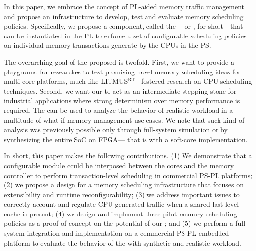 In this paper, we embrace the concept of PL-aided memory traffic
management and propose an infrastructure to develop, test and evaluate
memory scheduling policies. Specifically, we propose a component,
called the \schimL---or \schim, for short---that can be instantiated
in the PL to enforce a set of configurable scheduling policies on
individual memory transactions generate by the CPUs in the PS.

The overarching goal of the proposed \schim is twofold. First, we want
to provide a playground for researches to test promising novel memory
scheduling ideas for multi-core platforms, much like
LITMUS$^{\text{RT}}$~\cite{litmus-rt} fostered research on CPU
scheduling techniques. Second, we want our \schim to act as an
intermediate stepping stone for industrial applications where strong
determinism over memory performance is required. The \schim can be
used to analyze the behavior of realistic workload in a multitude of
what-if memory management use-cases. We note that such kind of
analysis was previously possible only through full-system simulation
or by synthesizing the entire SoC on FPGA--- that is with a soft-core
implementation.

In short, this paper makes the following contributions. (1) We
demonstrate that a configurable module could be interposed between the
cores and the memory controller to perform transaction-level
scheduling in commercial PS-PL platforms; (2) we propose a design for
a memory scheduling infrastructure that focuses on extensibility and
runtime reconfigurability; (3) we address important issues to
correctly account and regulate CPU-generated traffic when a shared
last-level cache is present; (4) we design and implement three pilot
memory scheduling policies as a proof-of-concept on the potential of
our \schim; and (5) we perform a full system integration and
implementation on a commercial PS-PL embedded platform to evaluate the
behavior of the \schim with synthetic and realistic workload.





